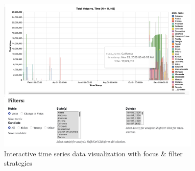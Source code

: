 \begin{figure}[H]
\centering
\captionsetup{justification=centering}
\includegraphics[width=0.9\textwidth]{Report-latex/tex_files/pics/time1.png}
\caption{Interactive time series data visualization with focus \& filter strategies \cite{2020timeseries} }
\label{fig:interactive-focus-filter}
\end{figure}
